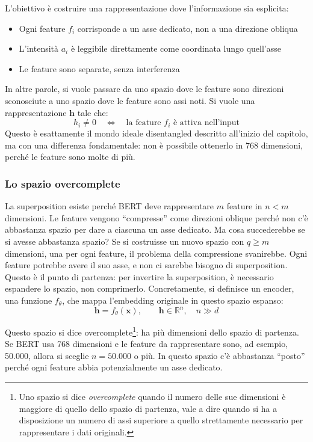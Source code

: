 L'obiettivo è costruire una rappresentazione dove l'informazione sia esplicita:
\begin{itemize}
    \item Ogni feature $f_i$ corrisponde a un asse dedicato, non a una direzione obliqua
    \item L'intensità $a_i$ è leggibile direttamente come coordinata lungo quell'asse
    \item Le feature sono separate, senza interferenza
\end{itemize}

In altre parole, si vuole passare da uno spazio dove le feature sono direzioni sconosciute a uno spazio dove le feature sono assi noti. Si vuole una rappresentazione $\mathbf{h}$ tale che:
\begin{equation}
    h_i \neq 0 \quad \Longleftrightarrow \quad \text{la feature } f_i \text{ è attiva nell'input}
\end{equation}
Questo è esattamente il mondo ideale disentangled descritto all'inizio del capitolo, ma con una differenza fondamentale: non è possibile ottenerlo in 768 dimensioni, perché le feature sono molte di più.
\subsubsection{Lo spazio overcomplete}
La superposition esiste perché BERT deve rappresentare $m$ feature in $n < m$ dimensioni. Le feature vengono ``compresse'' come direzioni oblique perché non c'è abbastanza spazio per dare a ciascuna un asse dedicato.
Ma cosa succederebbe se si avesse abbastanza spazio? Se si costruisse un nuovo spazio con $q \geq m$ dimensioni, una per ogni feature, il problema della compressione svanirebbe. Ogni feature potrebbe avere il suo asse, e non ci sarebbe bisogno di superposition.
Questo è il punto di partenza: per invertire la superposition, è necessario espandere lo spazio, non comprimerlo.
Concretamente, si definisce un encoder, una funzione $f_\theta$, che mappa l'embedding originale in questo spazio espanso:
\begin{equation}
    \mathbf{h} = f_\theta(\mathbf{x}), \qquad \mathbf{h} \in \mathbb{R}^n, \quad n \gg d
\end{equation}

Questo spazio si dice overcomplete\footnote{Uno spazio si dice \textit{overcomplete} quando il numero delle sue dimensioni è maggiore di quello dello spazio di partenza, vale a dire quando si ha a disposizione un numero di assi superiore a quello strettamente necessario per rappresentare i dati originali.}: ha più dimensioni dello spazio di partenza. Se BERT usa 768 dimensioni e le feature da rappresentare sono, ad esempio, 50.000, allora si sceglie $n = 50.000$ o più. In questo spazio c'è abbastanza ``posto'' perché ogni feature abbia potenzialmente un asse dedicato.

